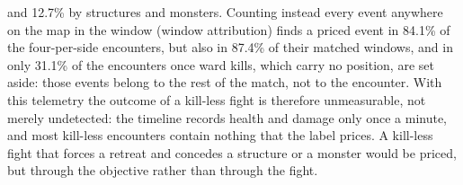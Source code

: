 and 12.7\% by structures and monsters. Counting instead every event anywhere on the map in the window
(window attribution) finds a priced event in 84.1\% of the four-per-side encounters, but also in 87.4\% of
their matched windows, and in only 31.1\% of the encounters once ward kills, which carry no position, are
set aside: those events belong to the rest of the match, not to the encounter.
With this telemetry the outcome of a kill-less fight is therefore unmeasurable, not merely undetected: the
timeline records health and damage only once a minute, and most kill-less encounters contain nothing that
the label prices. A kill-less fight that forces a retreat and concedes a structure or a monster would be
priced, but through the objective rather than through the fight.

